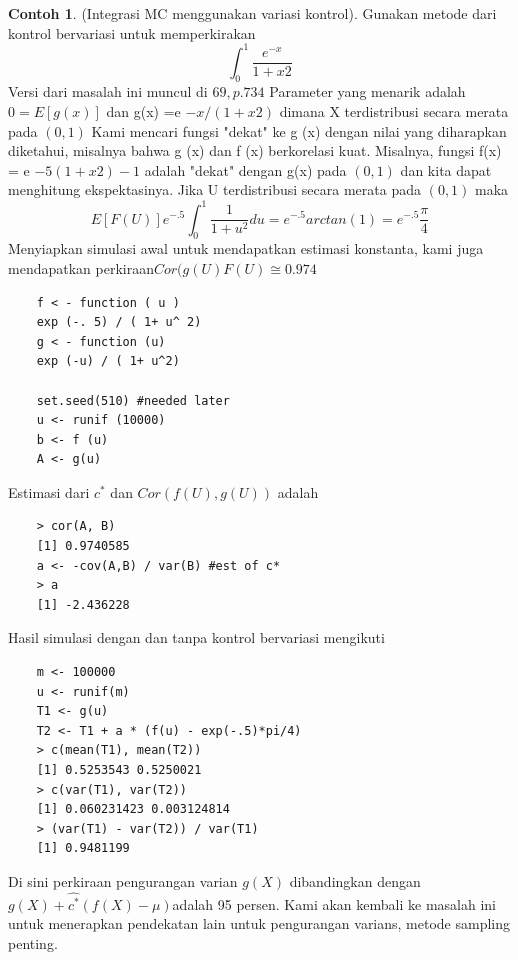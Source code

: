 \documentclass[a4paper,12pt]{article}
\theoremstyle{definition}
\newtheorem{example}{Contoh}[section]
\begin{document}
\begin{example}(Integrasi MC menggunakan variasi kontrol). Gunakan metode dari kontrol bervariasi untuk memperkirakan
\begin{equation*}
    \int_{0}^{1} \frac{e^{-x}}{1 + x{2}}
\end{equation*}
Versi dari masalah ini muncul di ${69,p. 734}$  Parameter yang menarik adalah $ 0= E[g(x)]$ dan g(x) =e $- x/\left ( 1+ x 2 \right )$ dimana X terdistribusi secara merata
pada $(0,1)$ Kami mencari fungsi "dekat" ke g (x) dengan nilai yang diharapkan diketahui, misalnya
bahwa g (x) dan f (x) berkorelasi kuat. Misalnya, fungsi f(x) = e $-5\left ( 1+ x2 \right ) -1$ adalah "dekat" dengan g(x) pada $(0,1)$ dan kita dapat menghitung ekspektasinya. Jika U terdistribusi secara merata pada $(0,1)$ maka
\begin{equation*}
    E[F\left ( U  \right )]e^{-.5}\int_{0}^{1}\frac{1}{1+u^{2}}du=e^{-.5}arctan\left ( 1 \right )=e^{-.5}\frac{\pi }{4}
\end{equation*} 
Menyiapkan simulasi awal untuk mendapatkan estimasi konstanta, kami juga mendapatkan perkiraan$Cor ( g (U) F (U)\cong 0.974$
\begin{lstlisting}
    f < - function ( u )
    exp (-. 5) / ( 1+ u^ 2)
    g < - function (u)
    exp (-u) / ( 1+ u^2)

    set.seed(510) #needed later
    u <- runif (10000)
    b <- f (u)
    A <- g(u) 
\end{lstlisting}
Estimasi dari $c^{*}$ dan $Cor\left ( f\left ( U \right ),g\left ( U \right ) \right )$ adalah\\

\begin{lstlisting}
    > cor(A, B)
    [1] 0.9740585
    a <- -cov(A,B) / var(B) #est of c*
    > a
    [1] -2.436228
\end{lstlisting}
Hasil simulasi dengan dan tanpa kontrol bervariasi mengikuti\\

\begin{lstlisting}
    m <- 100000
    u <- runif(m)
    T1 <- g(u)
    T2 <- T1 + a * (f(u) - exp(-.5)*pi/4)
    > c(mean(T1), mean(T2))
    [1] 0.5253543 0.5250021
    > c(var(T1), var(T2))
    [1] 0.060231423 0.003124814
    > (var(T1) - var(T2)) / var(T1)
    [1] 0.9481199
\end{lstlisting}   

Di sini perkiraan pengurangan varian $g(X)$ dibandingkan dengan $g(X)+\widehat{c^{*}}\left ( f\left ( X \right )-\mu  \right )$adalah 95 persen. Kami akan kembali ke masalah ini untuk menerapkan pendekatan lain untuk pengurangan varians, metode sampling penting.
\end{example} 
\end{document}
